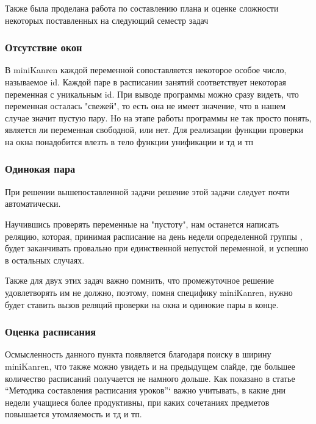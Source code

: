     
    Также была проделана работа по составлению плана и оценке сложности некоторых поставленных на следующий семестр задач
    \subsubsection{Отсутствие окон}
    В miniKanren каждой переменной сопоставляется некоторое особое число, называемое id. Каждой паре в расписании занятий соответствует некоторая переменная с уникальным id. При выводе программы можно сразу видеть, что переменная осталась "свежей", то есть она не имеет значение, что в нашем случае значит пустую пару. Но на этапе работы программы не так просто понять, является ли переменная свободной, или нет. Для реализации функции проверки на окна понадобится влезть в тело функции унификации и тд и тп
    \subsubsection{Одинокая пара}
    При решении вышепоставленной задачи решение этой задачи следует почти автоматически.

    Научившись проверять переменные на "пустоту", нам останется написать реляцию, которая, принимая расписание на день недели определенной группы , будет заканчивать провально при единственной непустой переменной, и успешно в остальных случаях.

    Также для двух этих задач важно помнить, что промежуточное решение удовлетворять им не должно, поэтому, помня специфику miniKanren, нужно будет ставить вызов реляций проверки на окна и одинокие пары в конце.
\subsubsection{Оценка расписания}
    Осмысленность данного пункта появляется благодаря поиску в ширину miniKanren, что также можно увидеть и на предыдущем слайде, где большее количество расписаний получается не намного дольше. 
     Как показано в статье ``Методика составления расписания уроков''`\cite{Методика} важно учитывать, в какие дни недели учащиеся более продуктивны, при каких сочетаниях предметов повышается утомляемость и тд и тп.





